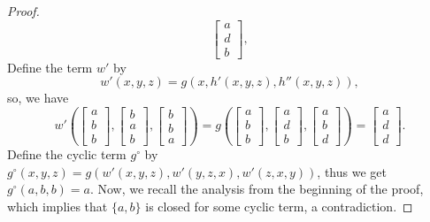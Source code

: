 \documentclass[11pt]{amsart}
\theoremstyle{definition}
\theoremstyle{remark}
\theoremstyle{plain}
\begin{document}
\begin{enumerate}[wide, labelindent=0pt]
\begin{proof}
\begin{equation*}
\begin{bmatrix}
a \\
d\\
b
\end{bmatrix},
\end{equation*}
Define the term $w'$ by $$w'(x,y,z)=g(x,h'(x,y,z),h''(x,y,z)),$$ so, we have 
\begin{equation*}
w'\left(
\begin{bmatrix}
a \\
b \\
b
\end{bmatrix}\!,\!
\begin{bmatrix}
b \\
a \\
b
\end{bmatrix}\!,\!
\begin{bmatrix}
b \\
b \\
a
\end{bmatrix}
\right)=g\left(
\begin{bmatrix}
a \\
b \\
b
\end{bmatrix}\!,\!
\begin{bmatrix}
a \\
d \\
b
\end{bmatrix}\!,\!
\begin{bmatrix}
a \\
b \\
d
\end{bmatrix}
\right)=
\begin{bmatrix}
a \\
d \\
d
\end{bmatrix}.
\end{equation*}
Define the cyclic term $g^{\circ}$ by $g^{\circ}(x,y,z)=g(w'(x,y,z),w'(y,z,x),w'(z,x,y))$, thus we get $g^{\circ}(a,b,b)=a$. Now, we recall the analysis from the beginning of the proof, which implies that $\{a,b\}$ is closed for some cyclic term, a contradiction.


\end{proof}
\end{enumerate}
\end{document}
